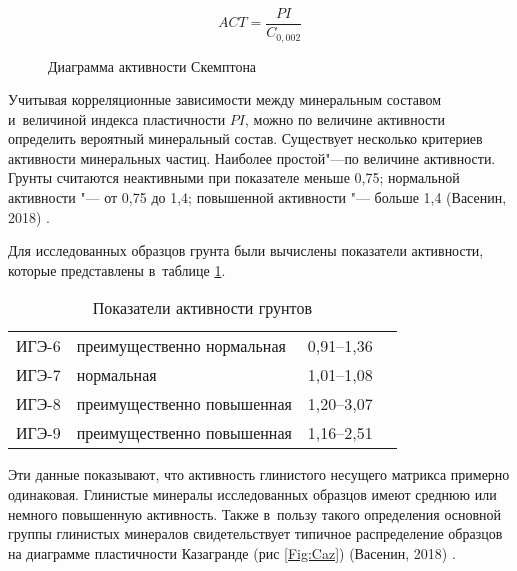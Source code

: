 \begin{equation}
    \label{eq:act}
    ACT = \frac{PI}{C_{0,002}}
\end{equation}

\begin{figure}[ht]
    \centering
    \small
    
    \caption{Диаграмма активности Скемптона}
    \label{Fig:Skt}
\end{figure}

Учитывая корреляционные зависимости между минеральным составом и~величиной индекса пластичности $PI$, можно по величине активности определить вероятный минеральный состав. Существует несколько критериев активности минеральных частиц. Наиболее простой"---по величине активности. 
Грунты считаются неактивными при показателе меньше 0,75; нормальной активности "--- от 0,75 до 1,4; повышенной активности "--- больше 1,4 (Васенин, 2018) \cite{vasenin2018}.





Для исследованных образцов грунта были вычислены показатели активности, которые представлены в~таблице \ref{tab:ak}.

\begin{table}[ht]
    \centering
    \caption{Показатели активности грунтов} \label{tab:ak}
    \begin{tabular}{clcc}
    ИГЭ-6 \dotfill &  преимущественно нормальная & 0,91--1,36 \\
    ИГЭ-7 \dotfill &  нормальная & 1,01--1,08 \\
    ИГЭ-8 \dotfill &  преимущественно повышенная & 1,20--3,07 \\
    ИГЭ-9 \dotfill &  преимущественно повышенная & 1,16--2,51\\
    \end{tabular}
\end{table}
    

Эти данные показывают, что активность глинистого несущего матрикса примерно одинаковая. Глинистые минералы исследованных образцов имеют среднюю или немного повышенную активность.
Также в~пользу такого определения основной группы глинистых минералов свидетельствует типичное распределение образцов на диаграмме пластичности Казагранде (рис \ref{Fig:Caz}) (Васенин, 2018) \cite{vasenin2018}.







